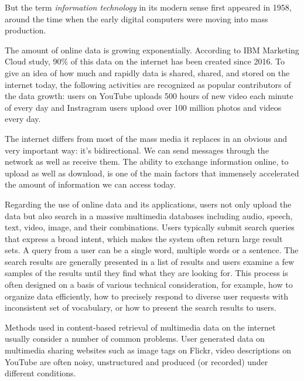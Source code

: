 But the term \textit{information technology} in its modern sense first appeared in 1958, around the time when the early digital computers were moving into mass production.

The amount of online data is growing exponentially. According to IBM Marketing Cloud study, 90\% of this data on the internet has been created since 2016. To give an idea of how much and rapidly data is shared, shared, and stored on the internet today, the following activities are recognized as popular contributors of the data growth: users on YouTube uploads 500 hours of new video each minute of every day and Instragram users upload over 100 million photos and videos every day. 

The internet differs from most of the mass media it replaces in an obvious and very important way: it's bidirectional. We can send messages through the network as well as receive them. The ability to exchange information online, to upload as well as download, is one of the main factors that immensely accelerated the amount of information we can access today.

Regarding the use of online data and its applications, users not only upload the data but also search in a massive multimedia databases including audio, speech, text, video, image, and their combinations.  
 Users typically submit search queries that express a broad intent, which makes the system often return large result sets. A query from a user can be a single word, multiple words or a sentence. The search results are generally presented in a list of results and users examine a few samples of the results until they find what they are looking for. This process is often designed on a basis of various technical consideration, for example, how to organize data efficiently, how to precisely respond to diverse user requests with inconsistent set of vocabulary, or how to present the search results to users.

Methods used in content-based retrieval of multimedia data on the internet usually consider a number of common problems. User generated data on multimedia sharing websites such as image tags on Flickr, video descriptions on YouTube are often noisy, unstructured and produced (or recorded) under different conditions.
\newpage


